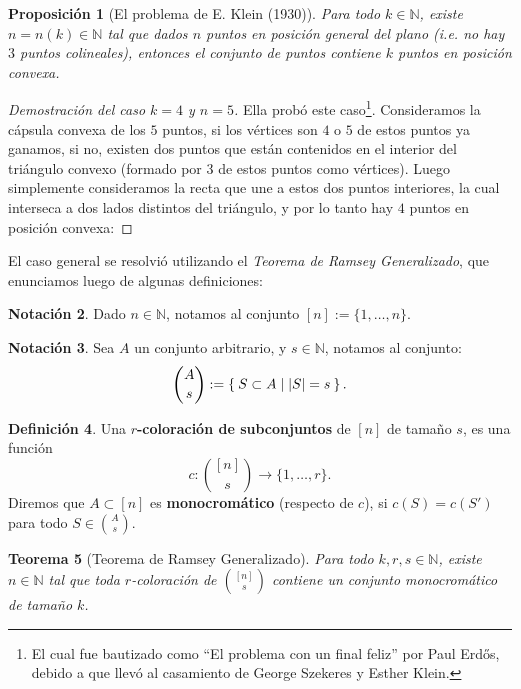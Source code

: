 \documentclass[12pt]{report}
\theoremstyle{plain}
\newtheorem{theorem}{Teorema}[section]
\newtheorem{proposition}[theorem]{Proposición}
\theoremstyle{definition}
\newtheorem{definition}[theorem]{Definición}
\newtheorem{notation}[theorem]{Notación}
\newcommand{\naturals}{\mathbb{N}}
\newcommand{\abs}[1]{\left \vert #1 \right \vert}
\begin{document}
\begin{proposition}[El problema de E. Klein (1930)]
Para todo $k \in \naturals$, existe $n = n(k) \in \naturals$ tal que dados $n$ puntos en posición general del plano (i.e. no hay $3$ puntos colineales), entonces el conjunto de puntos contiene $k$ puntos en posición convexa.
\end{proposition}
\begin{proof}[Demostración del caso $k = 4$ y $n = 5$]
Ella probó este caso\footnote{El cual fue bautizado como ``El problema con un final feliz'' por Paul Erdős, debido a que llevó al casamiento de George Szekeres y Esther Klein.}. Consideramos la cápsula convexa de los $5$ puntos, si los vértices son $4$ o $5$ de estos puntos ya ganamos, si no, existen dos puntos que están contenidos en el interior del triángulo convexo (formado por $3$ de estos puntos como vértices). Luego simplemente consideramos la recta que une a estos dos puntos interiores, la cual interseca a dos lados distintos del triángulo, y por lo tanto hay $4$ puntos en posición convexa:




\end{proof}

El caso general se resolvió utilizando el \textit{Teorema de Ramsey Generalizado}, que enunciamos luego de algunas definiciones:

\begin{notation}
Dado $n \in \naturals$, notamos al conjunto $[n] := \{1, \ldots, n\}$.
\end{notation}

\begin{notation}
Sea $A$ un conjunto arbitrario, y $s \in \naturals$, notamos al conjunto:
\[
    \binom{A}{s} := \Set{S \subset A | \abs S = s}.
\]
\end{notation}

\begin{definition}
Una \textbf{$r$-coloración de subconjuntos} de $[n]$ de tamaño $s$, es una función
\[
    c : \binom{[n]}{s} \longrightarrow \{1, \ldots, r\}.
\]
Diremos que $A \subset [n]$ es \textbf{monocromático} (respecto de $c$), si $c(S) = c(S')$ para todo $S \in \binom{A}s$.
\end{definition}

\begin{theorem}[Teorema de Ramsey Generalizado]\label{th:teorema de Ramsey Generalizado}
Para todo $k,r,s \in \naturals$, existe $n \in \naturals$ tal que toda $r$-coloración de $\binom{[n]}{s}$ contiene un conjunto monocromático de tamaño $k$.
\end{theorem}
\end{document}
